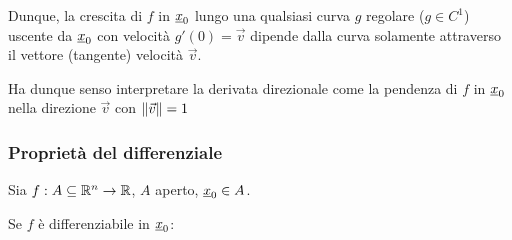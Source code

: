 Dunque, la crescita di \(f\) in \(\underline{x}_0\) lungo una qualsiasi curva \(g \) regolare (\(g \in C^{1}\)) uscente da \(\underline{x}_0\) con velocità \(g'(0) = \vec{v}\) dipende dalla curva solamente attraverso il vettore (tangente) velocità \(\vec{v} \).


Ha dunque senso interpretare la derivata direzionale come la pendenza di \(f\) in \(\underline{x}_0\) nella direzione \(\vec{v} \) con \(\left\lVert\vec{v}\right\rVert=1\)

\pagebreak
\subsubsection{Proprietà del differenziale}

Sia \(f: A \subseteq \mathbb{R}^{n} \rightarrow \mathbb{R} \), \(A\) aperto, \(\underline{x}_0 \in A\).

Se \(f\) è differenziabile in \(\underline{x}_0\):
